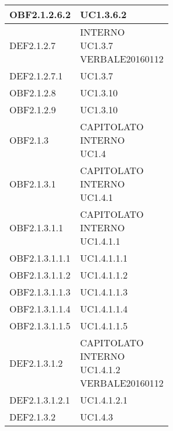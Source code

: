 \documentclass{scalatekids-article}
\begin{document}
\begin{longtable}[H]{|p{5.5cm}|p{5.5cm}|}
\hline
OBF2.1.2.6.2 & \multiLineCell[t]{UC1.3.6.2\\}\\
\hline
DEF2.1.2.7 & \multiLineCell[t]{INTERNO\\UC1.3.7\\VERBALE20160112\\}\\
\hline
DEF2.1.2.7.1 & \multiLineCell[t]{UC1.3.7\\}\\
\hline
OBF2.1.2.8 & \multiLineCell[t]{UC1.3.10\\}\\
\hline
OBF2.1.2.9 & \multiLineCell[t]{UC1.3.10\\}\\
\hline
OBF2.1.3 & \multiLineCell[t]{CAPITOLATO\\INTERNO\\UC1.4\\}\\
\hline
OBF2.1.3.1 & \multiLineCell[t]{CAPITOLATO\\INTERNO\\UC1.4.1\\}\\
\hline
OBF2.1.3.1.1 & \multiLineCell[t]{CAPITOLATO\\INTERNO\\UC1.4.1.1\\}\\
\hline
OBF2.1.3.1.1.1 & \multiLineCell[t]{UC1.4.1.1.1\\}\\
\hline
OBF2.1.3.1.1.2 & \multiLineCell[t]{UC1.4.1.1.2\\}\\
\hline
OBF2.1.3.1.1.3 & \multiLineCell[t]{UC1.4.1.1.3\\}\\
\hline
OBF2.1.3.1.1.4 & \multiLineCell[t]{UC1.4.1.1.4\\}\\
\hline
OBF2.1.3.1.1.5 & \multiLineCell[t]{UC1.4.1.1.5\\}\\
\hline
DEF2.1.3.1.2 & \multiLineCell[t]{CAPITOLATO\\INTERNO\\UC1.4.1.2\\VERBALE20160112\\}\\
\hline
DEF2.1.3.1.2.1 & \multiLineCell[t]{UC1.4.1.2.1\\}\\
\hline
DEF2.1.3.2 & \multiLineCell[t]{UC1.4.3\\}\\

\end{longtable}
\end{document}
